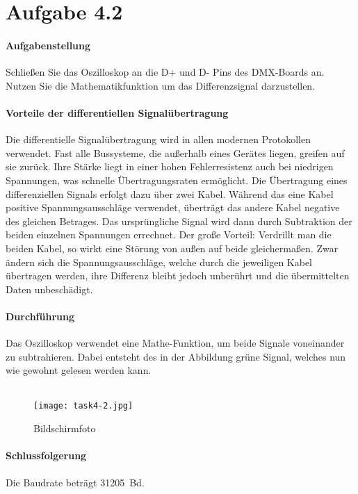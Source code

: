 \section{Aufgabe 4.2}
\paragraph{Aufgabenstellung}
Schließen Sie das Oszilloskop an die D+ und D- Pins des DMX-Boards an. Nutzen Sie die Mathematikfunktion um das Differenzsignal darzustellen.

\paragraph{Vorteile der differentiellen Signalübertragung}
Die differentielle Signalübertragung wird in allen modernen Protokollen verwendet. Fast alle Bussysteme, die außerhalb eines Gerätes liegen, greifen auf sie zurück. Ihre Stärke liegt in einer hohen Fehlerresistenz auch bei niedrigen Spannungen, was schnelle Übertragungsraten ermöglicht. Die Übertragung eines differenziellen Signals erfolgt dazu über zwei Kabel. Während das eine Kabel positive Spannungsausschläge verwendet, überträgt das andere Kabel negative des gleichen Betrages. Das ursprüngliche Signal wird dann durch Subtraktion der beiden einzelnen Spannungen errechnet. Der große Vorteil: Verdrillt man die beiden Kabel, so wirkt eine Störung von außen auf beide gleichermaßen. Zwar ändern sich die Spannungsausschläge, welche durch die jeweiligen Kabel übertragen werden, ihre Differenz bleibt jedoch unberührt und die übermittelten Daten unbeschädigt.

\paragraph{Durchführung}
Das Oszilloskop verwendet eine Mathe-Funktion, um beide Signale voneinander zu subtrahieren. Dabei entsteht des in der Abbildung grüne Signal, welches nun wie gewohnt gelesen werden kann. \\\\

\begin{figure}[!h]
	\centering
	\texttt{[image: task4-2.jpg]}
	\caption{Bildschirmfoto}
	\label{task4-2}
\end{figure}

\paragraph{Schlussfolgerung}
Die Baudrate beträgt \SI{31205}{Bd}.

